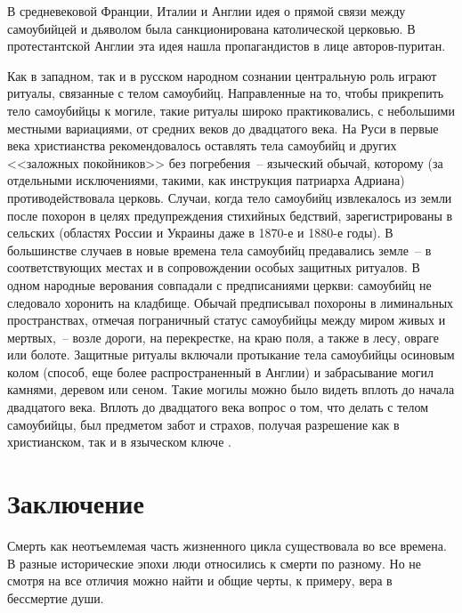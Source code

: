 \documentclass[pscyr,titlepage,chapters]{hedreport}
\begin{document}
  В средневековой Франции, Италии и Англии идея о прямой связи между самоубийцей
  и дьяволом была санкционирована католической церковью. В протестантской Англии
  эта идея нашла пропагандистов в лице авторов-пуритан.

  Как в западном, так и в русском народном сознании центральную роль играют
  ритуалы, связанные с телом самоубийц. Направленные на то, чтобы прикрепить
  тело самоубийцы к могиле, такие ритуалы широко практиковались, с небольшими
  местными вариациями, от средних веков до двадцатого века. На Руси в первые
  века христианства рекомендовалось оставлять тела самоубийц и других <<заложных
  покойников>> без погребения~-- языческий обычай, которому (за отдельными
  исключениями, такими, как инструкция патриарха Адриана) противодействовала
  церковь. Случаи, когда тело самоубийц извлекалось из земли после похорон в
  целях предупреждения стихийных бедствий, зарегистрированы в сельских (областях
  России и Украины даже в 1870-е и 1880-е годы). В большинстве случаев в новые
  времена тела самоубийц предавались земле~-- в соответствующих местах и в
  сопровождении особых защитных ритуалов. В одном народные верования совпадали с
  предписаниями церкви: самоубийц не следовало хоронить на кладбище. Обычай
  предписывал похороны в лиминальных пространствах, отмечая пограничный статус
  самоубийцы между миром живых и мертвых,~-- возле дороги, на перекрестке, на
  краю поля, а также в лесу, овраге или болоте. Защитные ритуалы включали
  протыкание тела самоубийцы осиновым колом (способ, еще более распространенный
  в Англии) и забрасывание могил камнями, деревом или сеном. Такие могилы можно
  было видеть вплоть до начала двадцатого века. Вплоть до двадцатого века вопрос
  о том, что делать с телом самоубийцы, был предметом забот и страхов, получая
  разрешение как в христианском, так и в языческом ключе \cite{3}.

  \chapter*{Заключение}

  Смерть как неотъемлемая часть жизненного цикла существовала во все времена. В
  разные исторические эпохи люди относились к смерти по разному. Но не смотря на
  все отличия можно найти и общие черты, к примеру, вера в бессмертие души.
\end{document}
